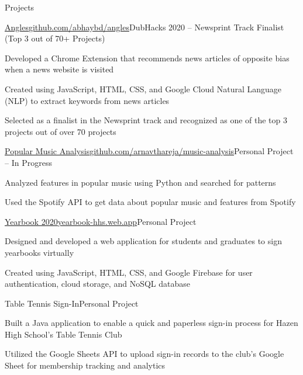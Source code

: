 \documentclass{resume} %
\begin{document}
\begin{rSection}{Projects}


\begin{project}{\href{https://github.com/abhaybd/angles}{Angles}}{\href{https://github.com/abhaybd/angles}{github.com/abhaybd/angles}}{DubHacks 2020 – Newsprint Track Finalist (Top 3 out of 70+ Projects)}
\item Developed a Chrome Extension that recommends news articles of opposite bias when a news website is visited
\item Created using JavaScript, HTML, CSS, and Google Cloud Natural Language (NLP) to extract keywords from news articles
\item Selected as a finalist in the Newsprint track and recognized as one of the top 3 projects out of over 70 projects
\end{project}

\begin{project}{\href{https://github.com/arnavthareja/music-analysis}{Popular Music Analysis}}{\href{https://github.com/arnavthareja/music-analysis}{github.com/arnavthareja/music-analysis}}{Personal Project – In Progress}
\item Analyzed features in popular music using Python and searched for patterns
\item Used the Spotify API to get data about popular music and features from Spotify
\end{project}

\begin{project}{\href{https://yearbook-hhs.web.app/}{Yearbook 2020}}{\href{https://yearbook-hhs.web.app/}{yearbook-hhs.web.app}}{Personal Project}
\item Designed and developed a web application for students and graduates to sign yearbooks virtually
\item Created using JavaScript, HTML, CSS, and Google Firebase for user authentication, cloud storage, and NoSQL database
\end{project}

\begin{project}{Table Tennis Sign-In}{}{Personal Project}
\item Built a Java application to enable a quick and paperless sign-in process for Hazen High School's Table Tennis Club
\item Utilized the Google Sheets API to upload sign-in records to the club's Google Sheet for membership tracking and analytics
\end{project}

\end{rSection}
\end{document}

